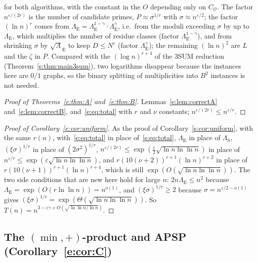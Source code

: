 \documentclass[11pt]{article}
\theoremstyle{definition}
\theoremstyle{remark}
\begin{document}
for both algorithms, with the constant in the $O$ depending only on $C_{\mathcal O}$. The factor $n^{\varepsilon/(2r)}$ is the number of candidate primes, $P\approx\sigma^{1/r}$ with $\sigma\approx n^{\varepsilon/2}$; the factor $(\ln n)^r$ comes from $\Lambda_{\mathrm E}=\Lambda_{\mathrm E}^{1-\gamma}\cdot\Lambda_{\mathrm E}^\gamma$, i.e.\ from the moduli exceeding $\sigma$ by up to $\Lambda_{\mathrm E}$, which multiplies the number of residue classes (factor $\Lambda_{\mathrm E}^{1-\gamma}$), and from shrinking $\sigma$ by $\sqrt\Lambda_{\mathrm E}$ to keep $D\le N^\varepsilon$ (factor $\Lambda_{\mathrm E}^\gamma$); the remaining $(\ln n)^2$ are $L$ and the $\zeta$ in $P$. Compared with the $(\log n)^{r+4}$ of the 3SUM reduction (Theorem~\ref{s:thm:main3sum}), two logarithms disappear because the instances here are $0/1$ graphs, so the binary splitting of multiplicities into $B^2$ instances is not needed.

\begin{proof}[Proof of Theorems~\ref{e:thm:A} and~\ref{e:thm:B}]
Lemmas~\ref{e:lem:correctA} and~\ref{e:lem:correctB}, and~\eqref{e:eq:total} with $r$ and $\nu$ constants; $n^{\varepsilon/(2r)}\le n^{\varepsilon/r}$.
\end{proof}

\begin{proof}[Proof of Corollary~\ref{e:cor:uniform}]
As the proof of Corollary~\ref{s:cor:uniform}, with the same $r(n)$, with~\eqref{e:eq:total} in place of~\eqref{s:eq:total}, $\Lambda_{\mathrm E}$ in place of $\Lambda_{\mathrm S}$, $(\xi\sigma)^{1/r}$ in place of $(2\sigma^2)^{1/r}$, $n^{\varepsilon/(2r)}\le\exp(\frac{\varepsilon}2\sqrt{\ln n\ln\ln n})$ in place of $n^{\varepsilon/r}\le\exp(\varepsilon\sqrt{\ln n\ln\ln n})$, and $r(10(\nu+2))^{r+1}(\ln n)^{r+2}$ in place of $r(10(\nu+1))^{r+1}(\ln n)^{r+4}$, which is still $\exp(O(\sqrt{\ln n\ln\ln n}))$. The two side conditions that are new here hold for large $n$: $2n\Lambda_{\mathrm E}\le n^2$ because $\Lambda_{\mathrm E}=\exp(O(r\ln\ln n))=n^{o(1)}$, and $(\xi\sigma)^{1/r}\ge2$ because $\sigma=n^{\varepsilon/2-o(1)}$ gives $(\xi\sigma)^{1/r}=\exp(\Theta(\sqrt{\ln n\ln\ln n}))$. So $T(n)=n^{3-\varepsilon\gamma+O(\sqrt{\ln\ln n/\ln n})}$.
\end{proof}

\subsection{The \texorpdfstring{$(\min,+)$}{(min,+)}-product and APSP (Corollary~\ref{e:cor:C})}\label{e:sec:apsp}
\end{document}
